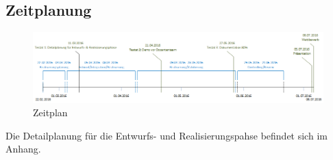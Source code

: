 \subsection{Zeitplanung}
\begin{figure}[H]%
\centering
\includegraphics[width=1.0\textwidth]{04_Projektmanagement/fig/zeitplan.png}
\caption{Zeitplan}
\label{fig:zeitplan}
\end{figure}
Die Detailplanung für die Entwurfs- und Realisierungspahse befindet sich im Anhang.

